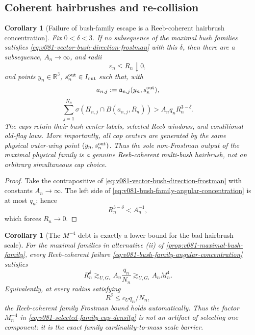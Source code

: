 \documentclass[10pt]{article}
\newtheorem{corollary}[theorem]{Corollary}
\begin{document}
\subsection{Coherent hairbrushes and re-collision}

\begin{corollary}[Failure of bush-family escape is a Reeb-coherent hairbrush concentration]
\label{cor:v081-bush-family-angular-concentration}
Fix \(0<\delta<3\).  If no subsequence of the maximal bush families satisfies
\eqref{eq:v081-vector-bush-direction-frostman} with this \(\delta\), then there are a subsequence,
\(A_n\to\infty\), and radii
\[
\varepsilon_n\le R_n\downarrow0,
\]
and points \(y_n\in\mathbb R^3\), \(s_n^{\rm out}\in I_{\rm out}\) such that, with
\[
a_{n,j}:=\mathfrak a_{n,j}(y_n,s_n^{\rm out}),
\]
\begin{equation}
\label{eq:v081-bush-family-angular-concentration}
\boxed{
\sum_{j=1}^{N_n}
\sigma\!\left(H_{n,j}\cap B(a_{n,j},R_n)\right)
>
A_nq_nR_n^{3-\delta}.
}
\end{equation}
The caps retain their bush-center labels, selected Reeb windows, and conditional old-flag laws.
More importantly, all cap centers are generated by the same physical outer-wing point
\((y_n,s_n^{\rm out})\).  Thus the sole non-Frostman output of the maximal physical family is a
genuine Reeb-coherent multi-bush hairbrush, not an arbitrary simultaneous cap choice.
\end{corollary}

\begin{proof}
Take the contrapositive of
\eqref{eq:v081-vector-bush-direction-frostman} with constants \(A_n\to\infty\).  The left side of
\eqref{eq:v081-bush-family-angular-concentration} is at most \(q_n\); hence
\[
R_n^{3-\delta}<A_n^{-1},
\]
which forces \(R_n\to0\).
\end{proof}

\begin{corollary}[The \(M^{-4}\) debt is exactly a lower bound for the bad hairbrush scale]
\label{cor:v081-hairbrush-bad-scale-lower-bound}
For the maximal families in alternative \textnormal{(ii)} of
\cref{prop:v081-maximal-bush-family}, every Reeb-coherent failure
\eqref{eq:v081-bush-family-angular-concentration} satisfies
\begin{equation}
\label{eq:v081-hairbrush-bad-scale-lower-bound}
\boxed{
R_n^\delta
\gtrsim_{U,G_*}
A_n\frac{q_n}{N_n}
\gtrsim_{U,G_*}
A_nM_n^4.
}
\end{equation}
Equivalently, at every radius satisfying
\begin{equation}
\label{eq:v081-hairbrush-automatic-frostman-range}
R^\delta\le c_Uq_n/N_n,
\end{equation}
the Reeb-coherent family Frostman bound holds automatically.  Thus the factor \(M_n^{-4}\) in
\eqref{eq:v081-selected-family-cap-density} is not an artifact of selecting one component: it is
the exact family cardinality-to-mass scale barrier.
\end{corollary}
\end{document}

